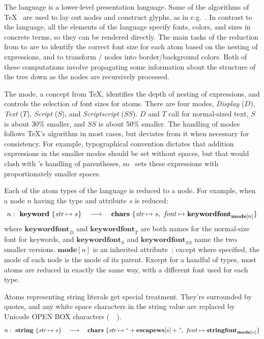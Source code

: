 The  language is a lower-level presentation language. Some of the algorithms of \TeX\ \cite{tex-math} are used to lay out nodes and construct glyphs, as in e.g.\ \cite{mathml}. In contrast to the  language, all the elements of the  language specify fonts, colors, and sizes in concrete terms, so they can be rendered directly. The main tasks of the reduction from  to  are to identify the correct font size for each atom based on the nesting of expressions, and to transform / nodes into border/background colors. Both of these computations involve propagating some information about the structure of the tree down as the nodes are recursively processed.

The mode, a concept from \TeX, identifies the depth of nesting of expressions, and controls the selection of font sizes for atoms. There are four modes, \textit{Display} ($D$), \textit{Text} ($T$), \textit{Script} ($S$), and \textit{Scriptscript} ($SS$). $D$ and $T$ call for normal-sized text, $S$ is about 30\% smaller, and $SS$ is about 50\% smaller. The handling of modes follows \TeX's algorithm in most cases, but deviates from it when necessary for consistency. For example, typographical convention dictates that addition expressions in the smaller modes should be set without spaces, but that would clash with \Meta's handling of parentheses, so \Meta\ sets these expressions with proportionately smaller spaces.

Each of the atom types of the  language is reduced to a  node. For example, when a node $n$ having the type  and  attribute $s$ is reduced:
$$
n:~{\mathbf{keyword}~\{  {\textit{str} \mapsto s}  \}} 
 	\quad \longrightarrow \quad
	{\mathbf{chars}~\{   {\textit{str} \mapsto s} ,~ {\textit{font} \mapsto  \mathbf{keywordfont}_{\mathbf{mode}[n]}}   \}}
$$
where $\mathbf{keywordfont}_D$ and $\mathbf{keywordfont}_T$ are both names for the normal-size font for keywords, and $\mathbf{keywordfont}_S$ and $\mathbf{keywordfont}_{SS}$ name the two smaller versions. $\mathbf{mode}[n]$ is an inherited attribute~\cite{attribute-grammar}; except where specified, the mode of each node is the mode of its parent. Except for a handful of types, most atoms are reduced in exactly the same way, with a different font used for each type.

\vspace{12pt}
Atoms representing string literals get special treatment. They're surrounded by quotes, and any white space characters in the string value are replaced by Unicode OPEN BOX characters (~\textvisiblespace~).
$$
n:~{\mathbf{string}~\{ {\textit{str} \mapsto s} \}} 
 	\quad \longrightarrow \quad
	{\mathbf{chars}~\{  {\textit{str} \mapsto \textrm{``} + \mathbf{escapews}[s] + \textrm{''}} ,
		~ {\textit{font} \mapsto \mathbf{stringfont}_{\mathbf{mode}[n]}}   \}}
$$

